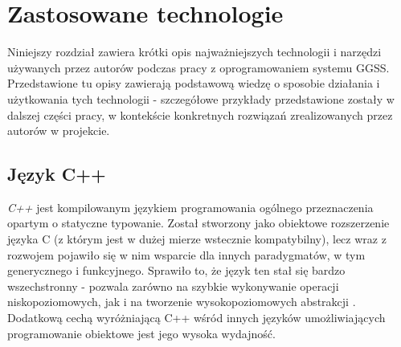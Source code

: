 \chapter{Zastosowane technologie}
\label{cha:teoria}
Niniejszy rozdział zawiera krótki opis najważniejszych technologii i narzędzi używanych przez autorów podczas pracy z oprogramowaniem systemu GGSS. Przedstawione tu opisy zawierają podstawową wiedzę o sposobie działania i użytkowania tych technologii - szczegółowe przykłady przedstawione zostały w dalszej części pracy, w kontekście konkretnych rozwiązań zrealizowanych przez autorów w projekcie.


\section{Język C++}
\textit{C++} jest kompilowanym językiem programowania ogólnego przeznaczenia \cite{Bjarne} opartym o statyczne typowanie. Został stworzony jako obiektowe rozszerzenie języka C (z którym jest w dużej mierze wstecznie kompatybilny), lecz wraz z rozwojem pojawiło się w nim wsparcie dla innych paradygmatów, w tym generycznego i funkcyjnego. Sprawiło to, że język ten stał się bardzo wszechstronny - pozwala zarówno na szybkie wykonywanie operacji niskopoziomowych, jak i na tworzenie wysokopoziomowych abstrakcji \cite{Bjarne}. Dodatkową cechą wyróżniającą C++ wśród innych języków umożliwiających programowanie obiektowe jest jego wysoka wydajność.

